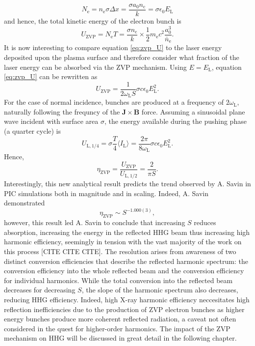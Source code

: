 \begin{equation}\label{eq:zvp-Ne}
	N_\mathrm{e} = n_\mathrm{e} \sigma \Delta x = \frac{\sigma a_0 n_\mathrm{c}}{k}  = \sigma \epsilon_0 E_\mathrm{L}
\end{equation}
and hence, the total kinetic energy of the electron bunch is
\begin{equation}\label{eq:zvp_U}
	U_\mathrm{ZVP} = N_\mathrm{e} T = \frac{\sigma n_\mathrm{c}}{k}\times \frac{1}{2}m_\mathrm{e}c^2 \frac{a^3_0}{\bar{n}_\mathrm{e}}.
\end{equation}
It is now interesting to compare equation \ref{eq:zvp_U} to the laser energy deposited upon the plasma surface and therefore consider what fraction of the laser energy can be absorbed via the \ac{ZVP} mechanism. Using $E = E_\mathrm{L}$, equation \ref{eq:zvp_U} can be rewritten as
\begin{equation}
	U_\mathrm{ZVP} = \frac{1}{2\omega_\mathrm{L} S}\sigma c \epsilon_0 E^2_\mathrm{L}.
\end{equation}
For the case of normal incidence, bunches are produced at a frequency of $2\omega_\mathrm{L}$, naturally following the frequncy of the $\mathbf{J}\times \mathbf{B}$ force. Assuming a sinusoidal plane wave incident with surface area $\sigma$, the energy available during the pushing phase (a quarter cycle) is
\begin{equation}
	 U_\mathrm{L,1/4} = \sigma \frac{T}{4}\langle I_\mathrm{L}\rangle = \frac{2\pi}{8\omega_\mathrm{L}}\sigma c\epsilon_0E^2_\mathrm{L}.
\end{equation}
Hence,
\begin{equation}
	\eta_\mathrm{ZVP} = \frac{U_\mathrm{ZVP}}{U_\mathrm{L,1/2}} = \frac{2}{\pi S}.
\end{equation}
Interestingly, this new analytical result predicts the trend observed by A. Savin \cite{savinModellingLaserPlasmaInteractions2019} in \ac{PIC} simulations both in magnitude and in scaling. Indeed, A. Savin demonstrated 
\begin{equation}
	\eta_\mathrm{ZVP} \sim S^{-1.000(3)},
\end{equation}
however, this result led A. Savin to conclude that increasing $S$ reduces absorption, increasing the energy in the reflected \ac{HHG} beam thus increasing high harmonic efficiency, seemingly in tension with the vast majority of the work on this process [CITE CITE CITE]. The resolution arises from awareness of two distinct conversion efficiencies that describe the reflected harmonic spectrum: the conversion efficiency into the whole reflected beam and the conversion efficiency for individual harmonics. While the total conversion into the reflected beam decreases for decreasing $S$, the slope of the harmonic spectrum also decreases, reducing \ac{HHG} efficiency. Indeed, high X-ray harmonic efficiency neccesitates high reflection inefficiencies due to the production of ZVP electron bunches as higher energy bunches produce more coherent reflected radiation, a caveat not often considered in the quest for higher-order harmonics. The impact of the ZVP mechanism on \ac{HHG} will be discussed in great detail in the following chapter.

